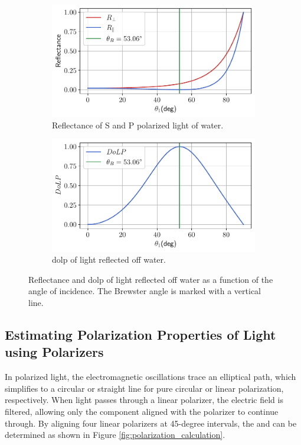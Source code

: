 \begin{figure}[H]
    \centering
    \begin{subfigure}{.5\textwidth}
        \centering
        \includegraphics[width=\textwidth]{figures/pol_plots/brewster0.pdf}
        \caption{Reflectance of S and P polarized light of water.}
        \label{fig:brewster0}
    \end{subfigure}
    \begin{subfigure}{.5\textwidth}
        \centering
        \includegraphics[width=\textwidth]{figures/pol_plots/brewster1.pdf}
        \caption{\gls{dolp} of light reflected off water. \label{fig:dolp_graph}}
        \label{fig:brewster1}
    \end{subfigure}
    \caption{Reflectance and \gls{dolp} of light reflected off water as a function of the angle of incidence.
        The Brewster angle is marked with a vertical line.}
    \label{fig:test}
\end{figure}




\subsection{Estimating Polarization Properties of Light using Polarizers}
In polarized light, the electromagnetic oscillations trace an elliptical path, which simplifies to a circular or straight line for pure circular or linear polarization, respectively.
When light passes through a linear polarizer, the electric field is filtered, allowing only the component aligned with the polarizer to continue through.
By aligning four linear polarizers at 45-degree intervals, the  and  can be determined as shown in Figure \ref{fig:polarization_calculation}.

